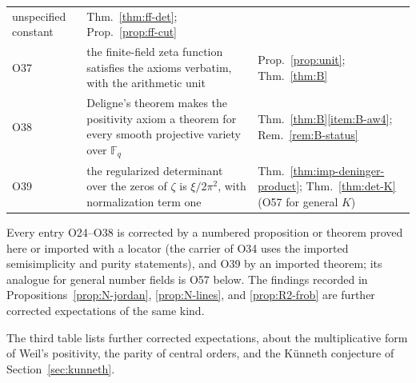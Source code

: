 \documentclass[11pt]{amsart}
\theoremstyle{plain}
\theoremstyle{definition}
\theoremstyle{remark}
\numberwithin{equation}{section}
\newcommand{\F}{\mathbb{F}}
\begin{document}
\begin{longtable}{@{}l>{\raggedright\arraybackslash}p{}
>{\raggedright\arraybackslash}p{}@{}}
  unspecified constant & Thm.~\ref{thm:ff-det};
  Prop.~\ref{prop:ff-cut}\\
O37 & the finite-field zeta function satisfies the axioms verbatim, with
  the arithmetic unit & Prop.~\ref{prop:unit}; Thm.~\ref{thm:B}\\
O38 & Deligne's theorem makes the positivity axiom a theorem for every
  smooth projective variety over $\F_q$ &
  Thm.~\ref{thm:B}\ref{item:B-aw4}; Rem.~\ref{rem:B-status}\\
O39 & the regularized determinant over the zeros of $\zeta$ is
  $\xi/2\pi^2$, with normalization term one &
  Thm.~\ref{thm:imp-deninger-product}; Thm.~\ref{thm:det-K} (O57 for
  general $K$)\\
\end{longtable}

Every entry O24--O38 is corrected by a numbered proposition or theorem
proved here or imported with a locator (the carrier of O34 uses the
imported semisimplicity and purity statements), and O39 by an imported
theorem;
its analogue for general
number fields is O57 below. The findings
recorded in Propositions~\ref{prop:N-jordan}, \ref{prop:N-lines}, and
\ref{prop:R2-frob} are further corrected expectations of the same
kind.

The third table lists further corrected expectations, about the
multiplicative form of Weil's positivity, the parity of central orders,
and the K\"unneth conjecture of Section~\ref{sec:kunneth}.
\end{document}
